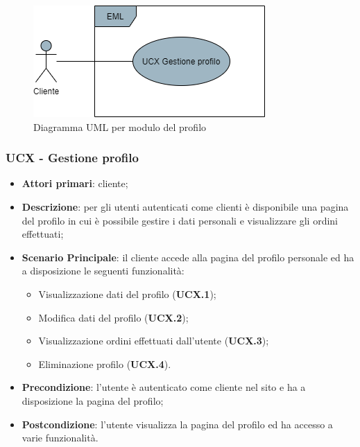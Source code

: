 \begin{figure}[H]
\centering
\includegraphics[scale=0.6]{res/UseCase/Immagini/ProfiloGenerale}
\caption{Diagramma UML per modulo del profilo}
\end{figure}

\subsubsection{UCX - Gestione profilo}
\begin{itemize}
\item \textbf{Attori primari}: cliente;
\item \textbf{Descrizione}: per gli utenti autenticati come clienti è disponibile una pagina del profilo in cui è possibile gestire i dati personali e visualizzare gli ordini effettuati;
\item \textbf{Scenario Principale}: il cliente accede alla pagina del profilo personale ed ha a disposizione le seguenti funzionalità:
\begin{itemize}
\item Visualizzazione dati del profilo (\textbf{UCX.1});
\item Modifica dati del profilo (\textbf{UCX.2});
\item Visualizzazione ordini effettuati dall'utente (\textbf{UCX.3});
\item Eliminazione profilo (\textbf{UCX.4}).
\end{itemize}
\item \textbf{Precondizione}: l'utente è autenticato come cliente nel sito e ha a disposizione la pagina del profilo;
\item \textbf{Postcondizione}: l'utente visualizza la pagina del profilo ed ha accesso a varie funzionalità.
\end{itemize}

